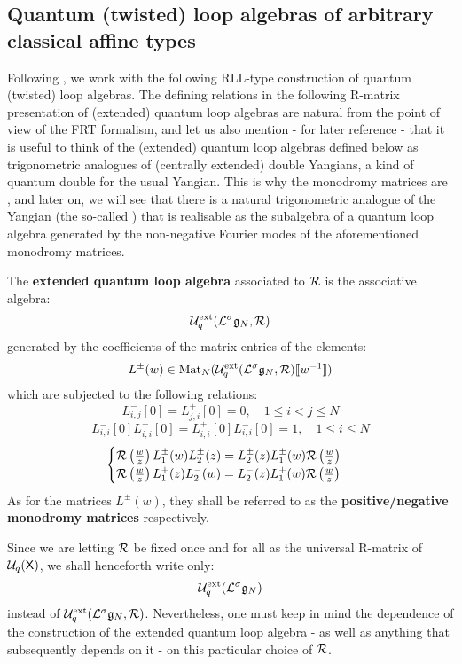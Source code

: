     \subsection{Quantum (twisted) loop algebras of arbitrary classical affine types}
        Following \cite{guay_regelskis_wendlandt_R_matrix_presentation_of_quantum_loop_algebras}, we work with the following RLL-type construction of quantum (twisted) loop algebras. The defining relations in the following R-matrix presentation of (extended) quantum loop algebras are natural from the point of view of the FRT formalism, and let us also mention - for later reference - that it is useful to think of the (extended) quantum loop algebras defined below as trigonometric analogues of (centrally extended) double Yangians, a kind of quantum double for the usual Yangian. This is why the monodromy matrices are , and later on, we will see that there is a natural trigonometric analogue of the Yangian (the so-called ) that is realisable as the subalgebra of a quantum loop algebra generated by the non-negative Fourier modes of the aforementioned monodromy matrices. 
        \begin{definition} \label{def: extended_quantum_loop_algebras_R_matrix_presentation}
            The \textbf{extended quantum loop algebra} associated to $\mathcal{R}$ is the associative algebra:
                $$\mathcal{U}_q^{\mathrm{ext}}(\mathcal{L}^{\sigma}\mathfrak{g}_N, \mathcal{R})$$
            generated by the coefficients of the matrix entries of the elements:
                $$L^{\pm}(w) \in \operatorname{Mat}_N( \mathcal{U}_q^{\mathrm{ext}}(\mathcal{L}^{\sigma}\mathfrak{g}_N, \mathcal{R})[\![w^{-1}]\!] )$$
            which are subjected to the following relations:
                $$L_{i, j}^-[0] = L_{j, i}^+[0] = 0, \quad 1 \leq i < j \leq N$$
                $$L_{i, i}^-[0] L_{i, i}^+[0] = L_{i, i}^+[0] L_{i, i}^-[0] = 1, \quad 1 \leq i \leq N$$
                $$
                    \begin{cases}
                        \mathcal{R}\left(\frac{w}{z}\right) L_1^{\pm}(w) L_2^{\pm}(z) = L_2^{\pm}(z) L_1^{\pm}(w) \mathcal{R}\left(\frac{w}{z}\right)
                        \\
                        \mathcal{R}\left(\frac{w}{z}\right) L_1^+(z) L_2^-(w) = L_2^-(z) L_1^+(w) \mathcal{R}\left(\frac{w}{z}\right)
                    \end{cases}
                $$
            As for the matrices $L^{\pm}(w)$, they shall be referred to as the \textbf{positive/negative monodromy matrices} respectively. 
        \end{definition}
        \begin{convention}
            Since we are letting $\mathcal{R}$ be fixed once and for all as the universal R-matrix of $\mathcal{U}_q(\mathsf{X})$, we shall henceforth write only:
                $$\mathcal{U}_q^{\mathrm{ext}}(\mathcal{L}^{\sigma}\mathfrak{g}_N)$$
            instead of $\mathcal{U}_q^{\mathrm{ext}}(\mathcal{L}^{\sigma}\mathfrak{g}_N, \mathcal{R})$. Nevertheless, one must keep in mind the dependence of the construction of the extended quantum loop algebra - as well as anything that subsequently depends on it - on this particular choice of $\mathcal{R}$.
        \end{convention}

